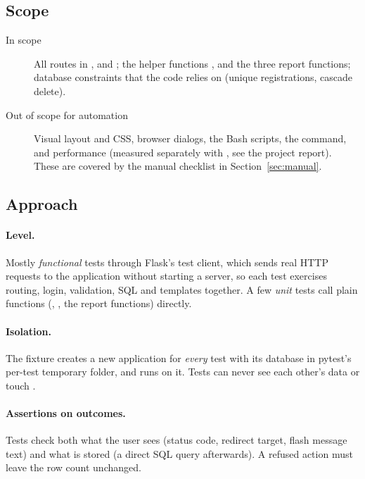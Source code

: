 \documentclass[11pt,a4paper]{article}
\begin{document}
\subsection{Scope}

\begin{description}
  \item[In scope] All routes in ,  and ; the helper functions
        ,  and the three report functions; database constraints that
        the code relies on (unique registrations, cascade delete).
  \item[Out of scope for automation] Visual layout and CSS, browser  dialogs, the
        Bash scripts, the  command, and performance (measured separately with
        , see the project report). These are covered by the manual checklist in
        Section~\ref{sec:manual}.
\end{description}

\subsection{Approach}

\paragraph{Level.} Mostly \emph{functional} tests through Flask's test client, which sends real
HTTP requests to the application without starting a server, so each test exercises routing,
login, validation, SQL and templates together. A few \emph{unit} tests call plain functions
(, , the report functions) directly.

\paragraph{Isolation.} The  fixture creates a new application for \emph{every} test with
its database in pytest's per-test temporary folder, and runs  on it. Tests can
never see each other's data or touch .

\paragraph{Assertions on outcomes.} Tests check both what the user sees (status code, redirect
target, flash message text) and what is stored (a direct SQL query afterwards). A refused action
must leave the row count unchanged.
\end{document}
